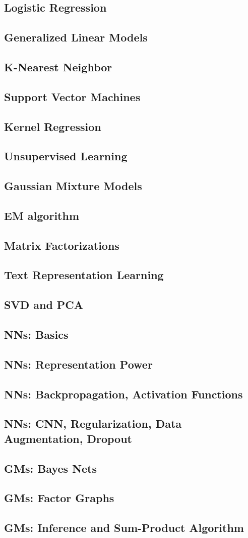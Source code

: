 \documentclass[twocolumn]{article}
\begin{document}
\subsection*{Logistic Regression}
\subsection*{Generalized Linear Models}
\subsection*{K-Nearest Neighbor}
\subsection*{Support Vector Machines}
\subsection*{Kernel Regression}
\subsection*{Unsupervised Learning}
\subsection*{Gaussian Mixture Models}
\subsection*{EM algorithm}
\subsection*{Matrix Factorizations}
\subsection*{Text Representation Learning}
\subsection*{SVD and PCA}
\subsection*{NNs: Basics}
\subsection*{NNs: Representation Power}
\subsection*{NNs: Backpropagation, Activation Functions}
\subsection*{NNs: CNN, Regularization, Data Augmentation, Dropout}
\subsection*{GMs: Bayes Nets}
\subsection*{GMs: Factor Graphs}
\subsection*{GMs: Inference and Sum-Product Algorithm}
\end{document}
